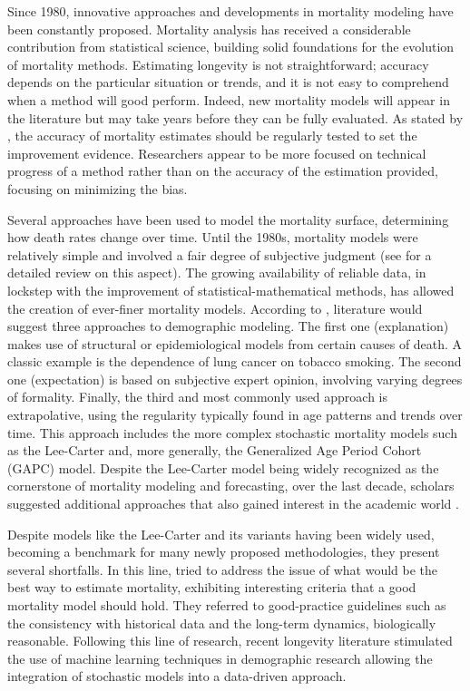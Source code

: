 \documentclass[a4,11pt]{article}
\begin{document}
Since 1980, innovative approaches and developments in mortality modeling have been constantly proposed. 
Mortality analysis has received a considerable contribution from statistical science, building solid foundations for the evolution of mortality methods. Estimating longevity is not straightforward; accuracy depends on the particular situation or trends, and it is not easy to comprehend when a method will good perform. Indeed, new mortality models will appear in the literature but may take years before they can be fully evaluated. As stated by \cite{Booth}, the accuracy of mortality estimates should be regularly tested to set the improvement evidence. Researchers appear to be more focused on technical progress of a method rather than on the accuracy of the estimation provided, focusing on minimizing the bias.

Several approaches have been used to model the mortality surface, determining how death rates change over time. Until the 1980s, mortality models were relatively simple and involved a fair degree of subjective judgment (see \cite{Pollard} for a detailed review on this aspect). The growing availability of reliable data, in lockstep with the improvement of statistical-mathematical methods, has allowed the creation of ever-finer mortality models. According to \cite{Booth}, literature would suggest three approaches to demographic modeling. 
The first one (explanation) makes use of structural or epidemiological models from certain causes of death. A classic example is the dependence of lung cancer on tobacco smoking. The second one (expectation) is based on subjective expert opinion, involving varying degrees of formality. Finally, the third and most commonly used approach is extrapolative, using the regularity typically found in age patterns and trends over time.
This approach includes the more complex stochastic mortality models such as the Lee-Carter \cite{LC92} and, more generally, the Generalized Age Period Cohort (GAPC) model. Despite the Lee-Carter model being widely recognized as the cornerstone of mortality modeling and forecasting, over the last decade, scholars suggested additional approaches that also gained interest in the academic world \cite{BDV2002,RH,CBD06,CBD09}.

Despite models like the Lee-Carter and its variants having been widely used, becoming a benchmark for many newly proposed methodologies, they present several shortfalls. In this line, \cite{CBD08} tried to address the issue of what would be the best way to estimate mortality, exhibiting interesting criteria that a good mortality model should hold. They referred to good-practice guidelines such as the consistency with historical data and the long-term dynamics, biologically reasonable. Following this line of research, recent longevity literature stimulated the use of machine learning techniques in demographic research allowing the integration of stochastic models into a data-driven approach. 
\end{document}
